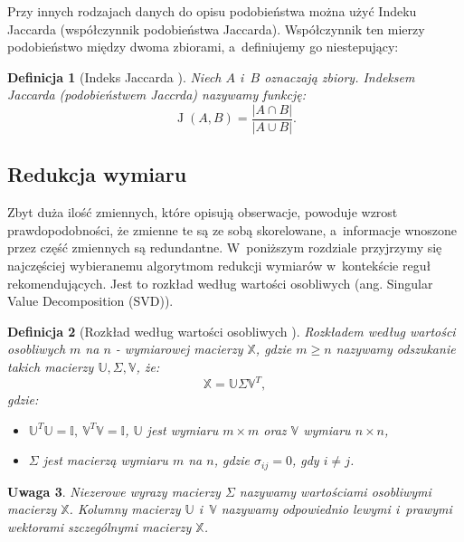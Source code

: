 \documentclass[12pt,a4paper]{report}
\newtheorem{df}{Definicja}[chapter]
\newtheorem{uwaga}[df]{Uwaga}
\newcommand{\J}[2]{\operatorname{J}\left({#1}, {#2} \right)}
\begin{document}
Przy innych rodzajach danych do opisu podobieństwa można użyć Indeku Jaccarda (współczynnik podobieństwa Jaccarda).  Współczynnik ten mierzy podobieństwo między dwoma zbiorami, a~definiujemy go niestepujący:

\begin{df}[Indeks Jaccarda  \citep{bre}]
Niech $\mathit{A}$ i~$\mathit{B}$ oznaczają zbiory. Indeksem Jaccarda (podobieństwem Jaccrda) nazywamy funkcję:
$$
\J{\mathit{A}}{\mathit{B}}=\frac{|\mathit{A}\cap \mathit{B}|}{|\mathit{A} \cup \mathit{B}|}.
$$
\end{df}

\subsection{Redukcja wymiaru}
Zbyt duża ilość zmiennych, które opisują obserwacje, powoduje wzrost prawdopodobności, że zmienne te są ze sobą skorelowane, a~informacje wnoszone przez część zmiennych są redundantne. W~poniższym rozdziale przyjrzymy się najczęściej wybieranemu algorytmom redukcji wymiarów w~kontekście reguł rekomendujących. Jest to rozkład według wartości osobliwych (ang. Singular Value Decomposition (SVD)).

\begin{df} [Rozkład według wartości osobliwych {\citep{ulafiir}}]%
Rozkładem według wartości osobliwych $m$ na $n$ - wymiarowej macierzy $\mathbb{X}$, gdzie $m\geq n$ nazywamy odszukanie takich macierzy $\mathbb{U}, \Sigma, \mathbb{V}$, że:
$$
\mathbb{X}=\mathbb{U} \Sigma \mathbb{V}^T,
$$
gdzie:
\begin{itemize}
\item $\mathbb{U}^T \mathbb{U} =\mathbb{I}, \:  \mathbb{V}^T \mathbb{V} = \mathbb{I}$, $\mathbb{U}$ jest wymiaru $m \times m$ oraz $\mathbb{V}$ wymiaru $n \times n$,
\item $\Sigma$ jest macierzą wymiaru $m$ na $n$, gdzie $\sigma_{ij} = 0$, gdy $i \neq j$.	
\end{itemize}
\end{df}

\begin{uwaga}{\citep{ulafiir}}
Niezerowe wyrazy macierzy $\Sigma$ nazywamy wartościami osobliwymi macierzy $\mathbb{X}$.
Kolumny macierzy $\mathbb{U}$ i~$\mathbb{V}$ nazywamy odpowiednio lewymi i~prawymi wektorami szczególnymi macierzy $\mathbb{X}$.
\end{uwaga}
\end{document}
